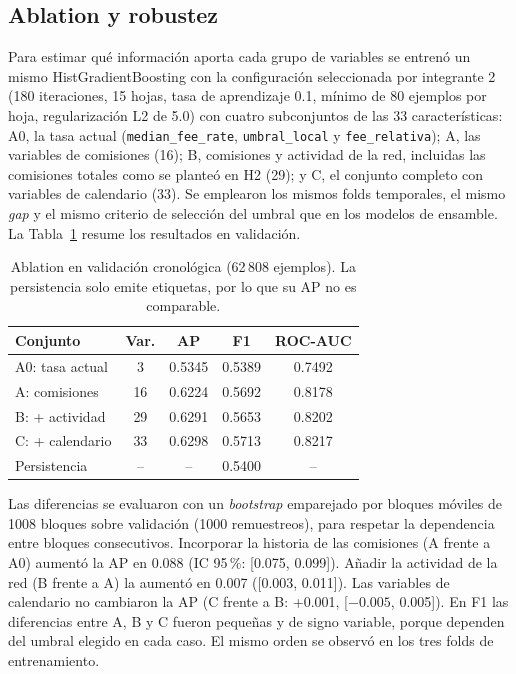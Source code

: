 \subsection{Ablation y robustez}
Para estimar qué información aporta cada grupo de variables se entrenó un mismo HistGradientBoosting con la configuración seleccionada por integrante 2 (180 iteraciones, 15 hojas, tasa de aprendizaje 0.1, mínimo de 80 ejemplos por hoja, regularización L2 de 5.0) con cuatro subconjuntos de las 33 características: A0, la tasa actual (\texttt{median\_fee\_rate}, \texttt{umbral\_local} y \texttt{fee\_relativa}); A, las variables de comisiones (16); B, comisiones y actividad de la red, incluidas las comisiones totales como se planteó en H2 (29); y C, el conjunto completo con variables de calendario (33). Se emplearon los mismos folds temporales, el mismo \textit{gap} y el mismo criterio de selección del umbral que en los modelos de ensamble. La Tabla~\ref{tab:ablation} resume los resultados en validación.

\begin{table}[htbp]
\caption{Ablation en validación cronológica (62\,808 ejemplos). La persistencia solo emite etiquetas, por lo que su AP no es comparable.}
\label{tab:ablation}
\centering
\small
\begin{tabular}{lcccc}
\hline
Conjunto & Var. & AP & F1 & ROC-AUC \\
\hline
A0: tasa actual & 3 & 0.5345 & 0.5389 & 0.7492 \\
A: comisiones & 16 & 0.6224 & 0.5692 & 0.8178 \\
B: + actividad & 29 & 0.6291 & 0.5653 & 0.8202 \\
C: + calendario & 33 & 0.6298 & 0.5713 & 0.8217 \\
Persistencia & -- & -- & 0.5400 & -- \\
\hline
\end{tabular}
\end{table}

Las diferencias se evaluaron con un \textit{bootstrap} emparejado por bloques móviles de 1008 bloques sobre validación (1000 remuestreos), para respetar la dependencia entre bloques consecutivos. Incorporar la historia de las comisiones (A frente a A0) aumentó la AP en 0.088 (IC 95\,\%: [0.075, 0.099]). Añadir la actividad de la red (B frente a A) la aumentó en 0.007 ([0.003, 0.011]). Las variables de calendario no cambiaron la AP (C frente a B: +0.001, [$-0.005$, 0.005]). En F1 las diferencias entre A, B y C fueron pequeñas y de signo variable, porque dependen del umbral elegido en cada caso. El mismo orden se observó en los tres folds de entrenamiento.

